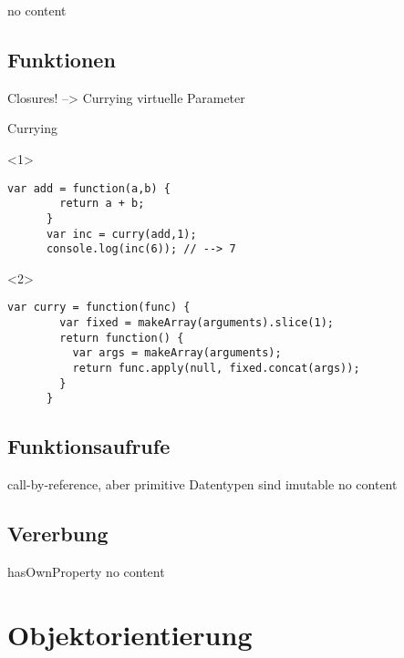 \begin{frame}
  no content
\end{frame}

\subsection{Funktionen}

\begin{frame}
  Closures! --> Currying
  virtuelle Parameter
\end{frame}

\begin{frame}[fragile]{Currying}
  \begin{onlyenv}<1>
    \begin{lstlisting}[gobble=6]
      var add = function(a,b) {
        return a + b;
      }
      var inc = curry(add,1);
      console.log(inc(6)); // --> 7
    \end{lstlisting}
  \end{onlyenv}
  
  \begin{onlyenv}<2>
    \begin{lstlisting}[gobble=6]
      var curry = function(func) {
        var fixed = makeArray(arguments).slice(1);
        return function() {
          var args = makeArray(arguments);
          return func.apply(null, fixed.concat(args));
        }
      }
    \end{lstlisting}
  \end{onlyenv}
\end{frame}

\subsection{Funktionsaufrufe}

\begin{frame}
  call-by-reference, aber primitive Datentypen sind imutable
  no content
\end{frame}

\subsection{Vererbung}

\begin{frame}
  hasOwnProperty
  no content
\end{frame}

\section{Objektorientierung}

